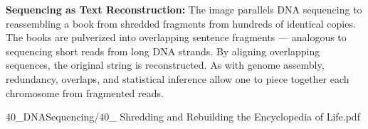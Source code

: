\begin{SideNotePage}{
  \textbf{Sequencing as Text Reconstruction:}  
  The image parallels DNA sequencing to reassembling a book from shredded fragments from hundreds of identical copies. The books are pulverized into overlapping sentence fragments — analogous to sequencing short reads from long DNA strands. By aligning overlapping sequences, the original string is reconstructed. As with genome assembly, redundancy, overlaps, and statistical inference allow one to piece together each chromosome from fragmented reads. \par
}{40_DNASequencing/40_ Shredding and Rebuilding the Encyclopedia of Life.pdf}
\end{SideNotePage}
